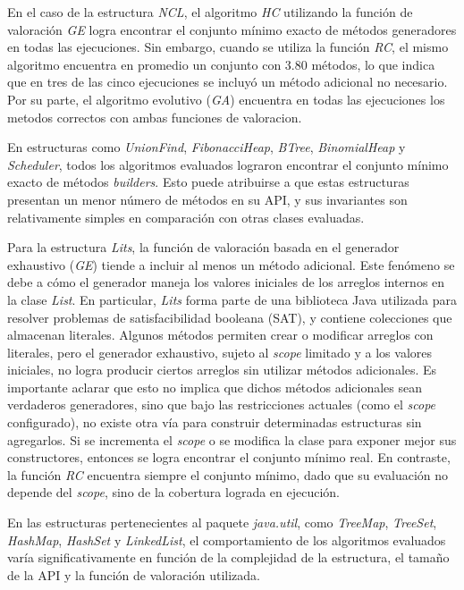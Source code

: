 En el caso de la estructura \emph{NCL}, el algoritmo \emph{HC} utilizando la función de valoración \emph{GE} logra encontrar el 
conjunto mínimo exacto de métodos generadores en todas las ejecuciones. Sin embargo, cuando se utiliza la función \emph{RC}, 
el mismo algoritmo encuentra en promedio un conjunto con 3.80 métodos, lo que indica que en tres de las cinco ejecuciones se incluyó 
un método adicional no necesario. Por su parte, el algoritmo evolutivo (\emph{GA}) encuentra en todas las ejecuciones los metodos correctos
con ambas funciones de valoracion.

En estructuras como \emph{UnionFind}, \emph{FibonacciHeap}, \emph{BTree}, \emph{BinomialHeap} y \emph{Scheduler}, todos los 
algoritmos evaluados lograron encontrar el conjunto mínimo exacto de métodos \emph{builders}. Esto puede atribuirse a que estas 
estructuras presentan un menor número de métodos en su API, y sus invariantes son relativamente simples en comparación con otras 
clases evaluadas.

Para la estructura \emph{Lits}, la función de valoración basada en el generador exhaustivo (\emph{GE}) tiende a incluir al menos un 
método adicional. Este fenómeno se debe a cómo el generador maneja los valores iniciales de los arreglos internos en la clase 
\emph{List}. En particular, \emph{Lits} forma parte de una biblioteca Java utilizada para resolver problemas de satisfacibilidad 
booleana (SAT), y contiene colecciones que almacenan literales. Algunos métodos permiten crear o modificar arreglos con literales, 
pero el generador exhaustivo, sujeto al \emph{scope} limitado y a los valores iniciales, no logra producir ciertos arreglos sin 
utilizar métodos adicionales. Es importante aclarar que esto no implica que dichos métodos adicionales sean verdaderos generadores, 
sino que bajo las restricciones actuales (como el \emph{scope} configurado), no existe otra vía para construir determinadas 
estructuras sin agregarlos. Si se incrementa el \emph{scope} o se modifica la clase para exponer mejor sus constructores, entonces 
se logra encontrar el conjunto mínimo real. En contraste, la función \emph{RC} encuentra siempre el conjunto mínimo, dado que su 
evaluación no depende del \emph{scope}, sino de la cobertura lograda en ejecución.

En las estructuras pertenecientes al paquete \emph{java.util}, como \emph{TreeMap}, \emph{TreeSet}, \emph{HashMap}, \emph{HashSet} y \emph{LinkedList}, 
el comportamiento de los algoritmos evaluados varía significativamente en función de la complejidad de la estructura, 
el tamaño de la API y la función de valoración utilizada.

